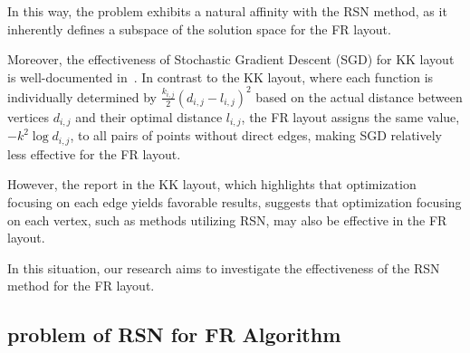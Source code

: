 \documentclass[dvipdfmx,journal]{IEEEtran}
\begin{document}
In this way, the problem exhibits a natural affinity with the RSN method, as it inherently defines a subspace of the solution space for the FR layout.

Moreover, the effectiveness of Stochastic Gradient Descent (SGD) for KK layout is well-documented in~\cite{8419285}.
In contrast to the KK layout, where each function is individually determined by $\frac{k_{i,j}}{2}(d_{i,j}-l_{i,j})^2$ based on the actual distance between vertices $d_{i,j}$ and their optimal distance $l_{i,j}$, the FR layout assigns the same value, $-k^2\log{d_{i,j}}$, to all pairs of points without direct edges, making SGD relatively less effective for the FR layout.

However, the report in the KK layout, which highlights that optimization focusing on each edge yields favorable results, suggests that optimization focusing on each vertex, such as methods utilizing RSN, may also be effective in the FR layout.

In this situation, our research aims to investigate the effectiveness of the RSN method for the FR layout.

\subsection{problem of RSN for FR Algorithm}
\end{document}
